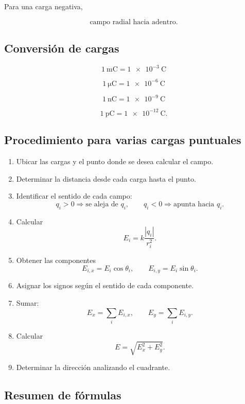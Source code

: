 Para una carga negativa,

\[
\boxed{\text{campo radial hacia adentro}}.
\]


\subsection{Conversión de cargas}

\[
\boxed{\SI{1}{\milli\coulomb}=\SI{1e-3}{\coulomb}}
\]

\[
\boxed{\SI{1}{\micro\coulomb}=\SI{1e-6}{\coulomb}}
\]

\[
\boxed{\SI{1}{\nano\coulomb}=\SI{1e-9}{\coulomb}}
\]

\[
\boxed{\SI{1}{\pico\coulomb}=\SI{1e-12}{\coulomb}}.
\]


\subsection{Procedimiento para varias cargas puntuales}

\begin{enumerate}
    \item Ubicar las cargas y el punto donde se desea calcular el campo.
    \item Determinar la distancia desde cada carga hasta el punto.
    \item Identificar el sentido de cada campo:
    \[
    q_i>0\Rightarrow\text{se aleja de }q_i,
    \qquad
    q_i<0\Rightarrow\text{apunta hacia }q_i.
    \]
    \item Calcular
    \[
    E_i=k\frac{|q_i|}{r_i^2}.
    \]
    \item Obtener las componentes
    \[
    E_{i,x}=E_i\cos\theta_i,
    \qquad
    E_{i,y}=E_i\sin\theta_i.
    \]
    \item Asignar los signos según el sentido de cada componente.
    \item Sumar:
    \[
    E_x=\sum_iE_{i,x},
    \qquad
    E_y=\sum_iE_{i,y}.
    \]
    \item Calcular
    \[
    E=\sqrt{E_x^2+E_y^2}.
    \]
    \item Determinar la dirección analizando el cuadrante.
\end{enumerate}


\subsection{Resumen de fórmulas}

